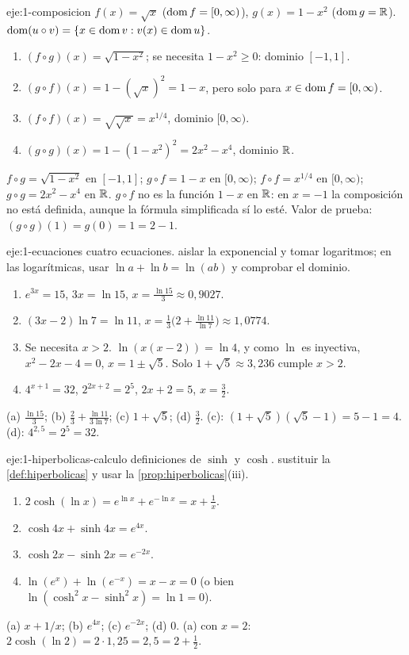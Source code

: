 \begin{solucion}{eje:1-composicion}
\datos $f(x)=\sqrt x$ ($\operatorname{dom} f=[0,\infty)$), $g(x)=1-x^{2}$ ($\operatorname{dom} g=\mathbb{R}$).
\planteamiento $\operatorname{dom}(u\circ v)=\{x\in\operatorname{dom} v: v(x)\in\operatorname{dom} u\}$.
\pasos
\begin{enumerate}[label=\arabic*.]
  \item $(f\circ g)(x)=\sqrt{1-x^{2}}$; se necesita $1-x^{2}\ge0$: dominio $[-1,1]$.
  \item $(g\circ f)(x)=1-(\sqrt x)^{2}=1-x$, pero solo para $x\in\operatorname{dom} f=[0,\infty)$.
  \item $(f\circ f)(x)=\sqrt{\sqrt x}=x^{1/4}$, dominio $[0,\infty)$.
  \item $(g\circ g)(x)=1-(1-x^{2})^{2}=2x^{2}-x^{4}$, dominio $\mathbb{R}$.
\end{enumerate}
\resultado $f\circ g=\sqrt{1-x^{2}}$ en $[-1,1]$; $g\circ f=1-x$ en $[0,\infty)$; $f\circ f=x^{1/4}$ en $[0,\infty)$; $g\circ g=2x^{2}-x^{4}$ en $\mathbb{R}$.
\comprobacion $g\circ f$ no es la función $1-x$ en $\mathbb{R}$: en $x=-1$ la composición no está definida, aunque la fórmula simplificada sí lo esté. Valor de prueba: $(g\circ g)(1)=g(0)=1=2-1$.
\end{solucion}

\begin{solucion}{eje:1-ecuaciones}
\datos cuatro ecuaciones.
\planteamiento aislar la exponencial y tomar logaritmos; en las logarítmicas, usar $\ln a+\ln b=\ln(ab)$ y comprobar el dominio.
\pasos
\begin{enumerate}[label=(\alph*)]
  \item $e^{3x}=15$, $3x=\ln15$, $x=\frac{\ln15}{3}\approx0{,}9027$.
  \item $(3x-2)\ln7=\ln11$, $x=\frac13\bigl(2+\frac{\ln11}{\ln7}\bigr)\approx1{,}0774$.
  \item Se necesita $x>2$. $\ln(x(x-2))=\ln4$, y como $\ln$ es inyectiva, $x^{2}-2x-4=0$, $x=1\pm\sqrt5$. Solo $1+\sqrt5\approx3{,}236$ cumple $x>2$.
  \item $4^{x+1}=32$, $2^{2x+2}=2^{5}$, $2x+2=5$, $x=\tfrac32$.
\end{enumerate}
\resultado (a) $\frac{\ln15}{3}$; (b) $\frac{2}{3}+\frac{\ln11}{3\ln7}$; (c) $1+\sqrt5$; (d) $\tfrac32$.
\comprobacion (c): $(1+\sqrt5)(\sqrt5-1)=5-1=4$. (d): $4^{2{,}5}=2^{5}=32$.
\end{solucion}

\begin{solucion}{eje:1-hiperbolicas-calculo}
\datos definiciones de $\sinh$ y $\cosh$.
\planteamiento sustituir la \cref{def:hiperbolicas} y usar la \cref{prop:hiperbolicas}(iii).
\pasos
\begin{enumerate}[label=(\alph*)]
  \item $2\cosh(\ln x)=e^{\ln x}+e^{-\ln x}=x+\frac1x$.
  \item $\cosh4x+\sinh4x=e^{4x}$.
  \item $\cosh2x-\sinh2x=e^{-2x}$.
  \item $\ln(e^{x})+\ln(e^{-x})=x-x=0$ (o bien $\ln(\cosh^{2}x-\sinh^{2}x)=\ln1=0$).
\end{enumerate}
\resultado (a) $x+1/x$; (b) $e^{4x}$; (c) $e^{-2x}$; (d) $0$.
\comprobacion (a) con $x=2$: $2\cosh(\ln2)=2\cdot1{,}25=2{,}5=2+\tfrac12$.
\end{solucion}


